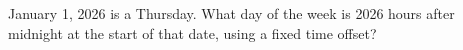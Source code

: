 January 1, 2026 is a Thursday. What day of the week is 2026 hours after midnight at the start of that date, using a fixed time offset?
